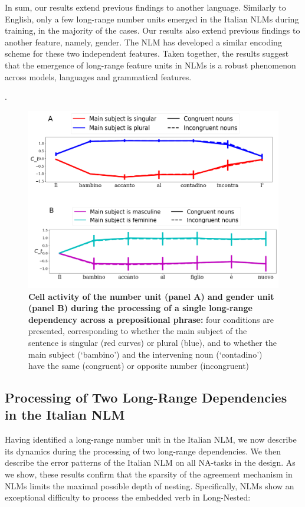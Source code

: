 \vspace{10pt}
In sum, our results extend previous findings to another language. Similarly to English, only a few long-range number units emerged in the Italian NLMs during training, in the majority of the cases. Our results also extend previous findings to another feature, namely, gender. The NLM has developed a similar encoding scheme for these two independent features. Taken together, the results suggest that the emergence of long-range feature units in NLMs is a robust phenomenon across models, languages and grammatical features. 

. 

\begin{figure}
    \centering
    \includegraphics[width=\textwidth]{figures/model_activations_nounpp.png}
    \caption{\textbf{Cell activity of the number unit (panel A) and gender unit (panel B) during the processing of a single long-range dependency across a prepositional phrase:} four conditions are presented, corresponding to whether the main subject of the sentence is singular (red curves) or plural (blue), and to whether the main subject (`bambino') and the intervening noun (`contadino') have the same (congruent) or opposite number (incongruent)}
    \label{fig:nounpp}
\end{figure} 

\subsection{Processing of Two Long-Range Dependencies in the Italian NLM}
Having identified a long-range number unit in the Italian NLM, we now describe its dynamics during the processing of two long-range dependencies. We then describe the error patterns of the Italian NLM on all NA-tasks in the design. As we show, these results confirm that the sparsity of the agreement mechanism in NLMs limits the maximal possible depth of nesting. Specifically, NLMs show an exceptional difficulty to process the embedded verb in Long-Nested:


